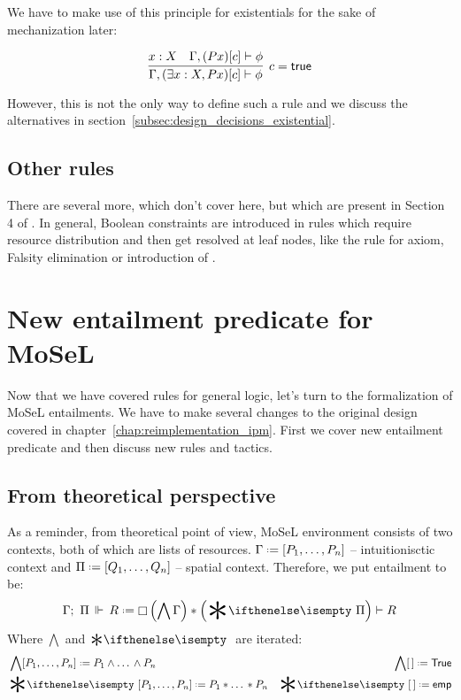 We have to make use of this principle for existentials for the sake of mechanization later:

\[
\infer[c = \true]
      {\Gamma, (\exists x : X, P x)[c] \vdash \phi}
      {x : X &
       \Gamma, (P x)[c] \vdash \phi}
\]

However, this is not the only way to define such a rule and we discuss the alternatives in section~\ref{subsec:design_decisions_existential}.

\subsection{Other rules}
\label{subsec:other-rules}

There are several more, which don't cover here, but which are present in Section 4 of \citet{harlandResourceDistributionBooleanConstraints2003}.
In general, Boolean constraints are introduced in rules which require resource distribution and then get resolved at leaf nodes, like the rule for axiom, Falsity elimination or introduction of \emp.

\section{New entailment predicate for MoSeL}

Now that we have covered rules for general logic, let's turn to the formalization of MoSeL entailments.
We have to make several changes to the original design covered in chapter~\ref{chap:reimplementation_ipm}.
First we cover new entailment predicate and then discuss new rules and tactics.

\subsection{From theoretical perspective}

As a reminder, from theoretical point of view, MoSeL environment consists of two contexts, both of which are lists of resources.
\(\IntuD \defeq [\dd P n]\) -- intuitionisctic context and \(\SpatD \defeq [\dd Q n]\) -- spatial context.
Therefore, we put entailment to be: \[\entailsD R \defeq \intuit \left(\bigwedge \IntuD\right) * \left(\Sep \SpatD\right) \vdash R\]
Where \(\bigwedge\) and \(\Sep\) are iterated:
\begin{align*}
  & \bigwedge  [\dd P n] \defeq P_1 \wedge \dots\, \wedge P_n
  & \bigwedge [\,] \defeq \True \\
  & \Sep {[\dd P n]} \defeq P_1 * \dots\, * P_n
  & \Sep {[\,]} \defeq \emp
\end{align*}

